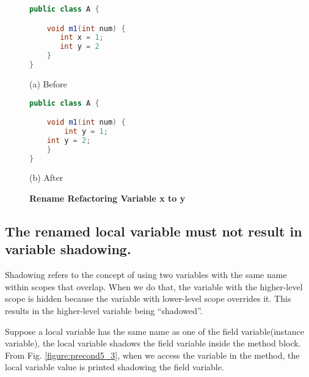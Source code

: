 \begin{figure}[th]
\centering
\begin{minipage}[t]{0.4\linewidth}
\begin{lstlisting}[language=java, basicstyle=\scriptsize\ttfamily,frame=single]
public class A {

    void m1(int num) {
       int x = 1; 
       int y = 2
    }
}
\end{lstlisting}
\centering(a) Before 
\end{minipage}
\hfill
\begin{minipage}[t]{0.4\linewidth}
\begin{lstlisting}[language=java, basicstyle=\scriptsize\ttfamily,frame=single]
public class A {

    void m1(int num) {
        int y = 1; 
	int y = 2;
    }
}
\end{lstlisting}
\centering(b) After 
\end{minipage}
\caption{\textbf{Rename Refactoring Variable x to y}}
\label{figure:precond5_2}
\end{figure}

\subsection{The renamed local variable must not result in variable shadowing.}
Shadowing refers to the concept of using two variables with the same name within scopes that overlap. When we do that, the variable with the higher-level scope is hidden because the variable with lower-level scope overrides it. This results in the higher-level variable being ``shadowed''. 


Suppose a local variable has the same name as one of the field variable(instance variable), the local variable shadows the field variable inside the method block. From Fig. \ref{figure:precond5_3}, when we access the variable in the method, the local variable value is printed shadowing the field variable.


